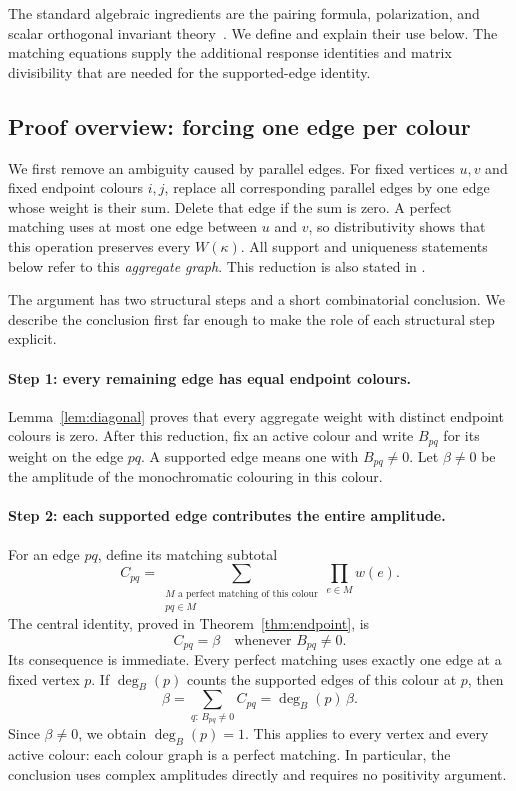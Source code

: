 \documentclass[11pt]{article}
\theoremstyle{definition}
\theoremstyle{plain}
\numberwithin{equation}{section}
\begin{document}
The standard algebraic ingredients are the pairing formula, polarization,
and scalar orthogonal invariant theory~\cite{isserlis,kraft}. We define and
explain their use below. The matching equations supply the additional
response identities and matrix divisibility that are needed for the
supported-edge identity.

\subsection{Proof overview: forcing one edge per colour}\label{sec:overview}

We first remove an ambiguity caused by parallel edges. For fixed vertices
\(u,v\) and fixed endpoint colours \(i,j\), replace all corresponding
parallel edges by one edge whose weight is their sum. Delete that edge if
the sum is zero. A perfect matching uses at most one edge between \(u\) and
\(v\), so distributivity shows that this operation preserves every
\(W(\kappa)\). All support and uniqueness statements below refer to this
\emph{aggregate graph}. This reduction is also stated in
\cite[page~41:5]{cgi}.

The argument has two structural steps and a short combinatorial conclusion.
We describe the conclusion first far enough to make the role of each
structural step explicit.

\paragraph{Step 1: every remaining edge has equal endpoint colours.}
Lemma~\ref{lem:diagonal} proves that every aggregate weight with distinct
endpoint colours is zero. After this reduction, fix an active colour and
write \(B_{pq}\) for its weight on the edge \(pq\). A supported edge means
one with \(B_{pq}\ne0\). Let \(\beta\ne0\) be the amplitude of the
monochromatic colouring in this colour.

\paragraph{Step 2: each supported edge contributes the entire amplitude.}
For an edge \(pq\), define its matching subtotal
\[
 C_{pq}=\sum_{\substack{M\text{ a perfect matching of this colour}\\pq\in M}}
              \prod_{e\in M}w(e).
\]
The central identity, proved in Theorem~\ref{thm:endpoint}, is
\[
 \boxed{C_{pq}=\beta\quad\text{whenever }B_{pq}\ne0.}
\]
Its consequence is immediate. Every perfect matching uses exactly one edge
at a fixed vertex \(p\). If \(\deg_B(p)\) counts the supported edges of
this colour at \(p\), then
\[
 \beta=\sum_{q:\,B_{pq}\ne0}C_{pq}=\deg_B(p)\,\beta.
\]
Since \(\beta\ne0\), we obtain \(\deg_B(p)=1\). This applies to every
vertex and every active colour: each colour graph is a perfect matching.
In particular, the conclusion uses complex amplitudes directly and requires
no positivity argument.
\end{document}
